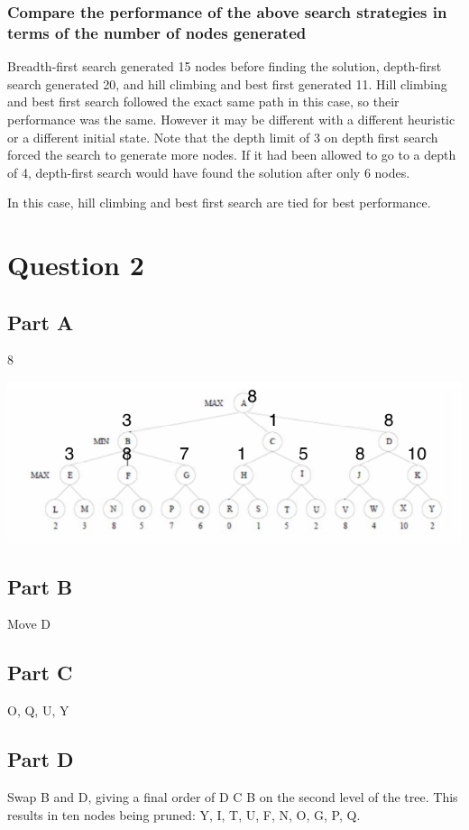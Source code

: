 \documentclass[a4paper]{article}
\begin{document}
\subsubsection{Compare the performance of the above search strategies in terms of the number of nodes generated}
Breadth-first search generated 15 nodes before finding the solution, depth-first search generated 20, and hill climbing and best first generated 11.
Hill climbing and best first search followed the exact same path in this case, so their performance was the same.  However it may be different with a 
different heuristic or a different initial state. Note that the depth limit of 3 on depth first search forced the search to generate more nodes.  If it 
had been allowed to go to a depth of 4, depth-first search would have found the solution after only 6 nodes.

In this case, hill climbing and best first search are tied for best performance.

\section{Question 2}



\subsection{Part A}
8
\begin{center}
\includegraphics[width=1\textwidth]{a1q2a.png}
\end{center}

\subsection{Part B}
Move D

\subsection{Part C}
{O, Q, U, Y}

\subsection{Part D}
Swap B and D, giving a final order of {D C B} on the second level of the tree.
This results in ten nodes being pruned: {Y, I, T, U, F, N, O, G, P, Q}.
\end{document}
